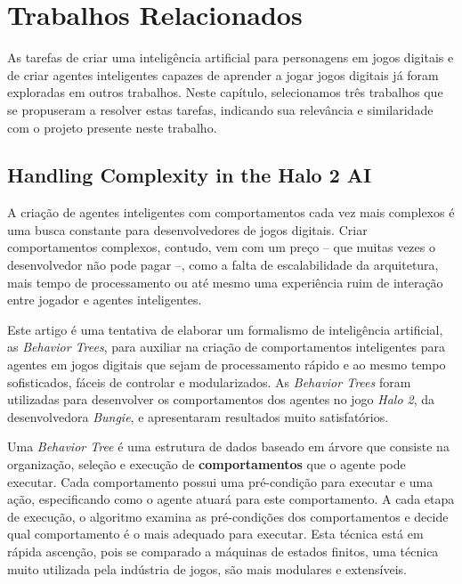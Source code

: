 \chapter{\label{chap:related-work}Trabalhos Relacionados}
As tarefas de criar uma inteligência artificial para personagens em jogos
digitais e de criar agentes inteligentes capazes de aprender a jogar jogos
digitais já foram exploradas em outros trabalhos. Neste capítulo, selecionamos
três trabalhos que se propuseram a resolver estas tarefas, indicando sua
relevância e similaridade com o projeto presente neste trabalho. 


\section{Handling Complexity in the Halo 2 AI}
A criação de agentes inteligentes com comportamentos cada vez mais complexos é
uma busca constante para desenvolvedores de jogos digitais. Criar comportamentos
complexos, contudo, vem com um preço -- que muitas vezes o desenvolvedor não
pode pagar --, como a falta de escalabilidade da arquitetura, mais tempo de
processamento ou até mesmo uma experiência ruim de interação entre jogador e
agentes inteligentes.

Este artigo é uma tentativa de elaborar um formalismo de inteligência
artificial, as \textit{Behavior Trees}, para auxiliar na criação de
comportamentos inteligentes para agentes em jogos digitais que sejam de
processamento rápido e ao mesmo tempo sofisticados, fáceis de controlar e
modularizados. As \textit{Behavior Trees} foram utilizadas para desenvolver os
comportamentos dos agentes no jogo \textit{Halo 2}, da desenvolvedora
\textit{Bungie}, e apresentaram resultados muito satisfatórios\cite{Halo2AI}.

Uma \textit{Behavior Tree} é uma estrutura de dados baseado em árvore que
consiste na organização, seleção e execução de \textbf{comportamentos} que o
agente pode executar. Cada comportamento possui uma pré-condição para executar e
uma ação, especificando como o agente atuará para este comportamento. A cada
etapa de execução, o algoritmo examina as pré-condições dos comportamentos e
decide qual comportamento é o mais adequado para executar. Esta técnica está em
rápida ascenção, pois se comparado a máquinas de estados finitos, uma técnica
muito utilizada pela indústria de jogos, são mais modulares e
extensíveis\cite{Rabin:2015:GAP:2821138}.


